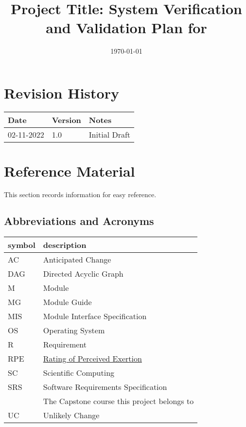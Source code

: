 \documentclass[12pt, titlepage]{article}
\begin{document}
	
	\title{Project Title: System Verification and Validation Plan for \progname{}} 
	\author{\authname}
	\date{\today}
	
	\maketitle
	
	
	\section{Revision History}
	
	\begin{tabularx}{\textwidth}{p{3cm}p{2cm}X}
		\toprule {\bf Date} & {\bf Version} & {\bf Notes}\\
		\midrule
		02-11-2022 & 1.0 & Initial Draft\\
		\bottomrule
	\end{tabularx}
	
	\newpage
	
	\section{Reference Material}
	
	This section records information for easy reference.
	
	\subsection{Abbreviations and Acronyms}
	
	\renewcommand{\arraystretch}{1.2}
	\begin{tabular}{l l} 
		\toprule		
		\textbf{symbol} & \textbf{description}\\
		\midrule 
		AC & Anticipated Change\\
		DAG & Directed Acyclic Graph \\
		M & Module \\
		MG & Module Guide \\
		MIS & Module Interface Specification \\
		OS & Operating System \\
		R & Requirement\\
		RPE & \href{https://en.wikipedia.org/wiki/Rating_of_perceived_exertion}{Rating of Perceived Exertion} \\
		SC & Scientific Computing \\
		SRS & Software Requirements Specification\\
		\progname & The Capstone course this project belongs to \\
		UC & Unlikely Change \\
		\bottomrule
	\end{tabular}\\
	
\end{document}
